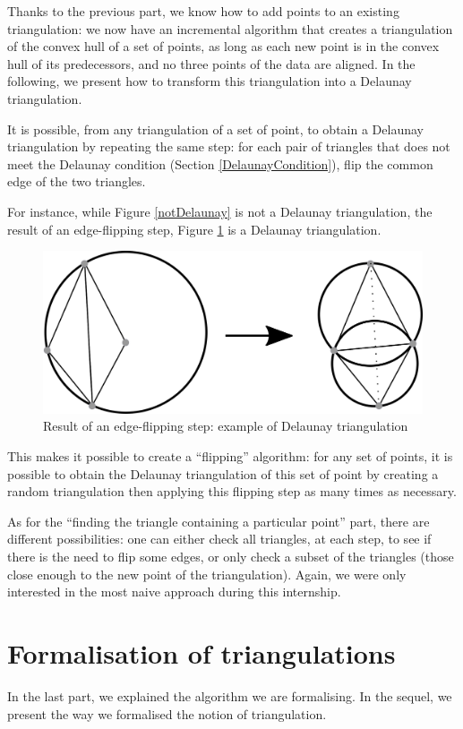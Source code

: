 \documentclass[a4paper,10pt]{article}
\begin{document}
Thanks to the previous part, we know how to add points to an existing triangulation: we now have an incremental algorithm that creates a triangulation of the convex hull of a set of points, as long as each new point is in the convex hull of its predecessors, and no three points of the data are aligned. In the following, we present how to transform this triangulation into a Delaunay triangulation.

It is possible, from any triangulation of a set of point, to obtain a Delaunay triangulation by repeating the same step: for each pair of triangles that does not meet the Delaunay condition (Section \ref{DelaunayCondition}), flip the common edge of the two triangles.

For instance, while Figure \ref{notDelaunay} is not a Delaunay triangulation, the result of an edge-flipping step, Figure \ref{DelaunayTriangulation} is a Delaunay triangulation.
\begin{figure}
\centering
\includegraphics[scale=1]{dessin1}
\caption{\label{DelaunayTriangulation} Result of an edge-flipping step: example of Delaunay triangulation}
\end{figure}
This makes it possible to create a ``flipping'' algorithm: for any set of points, it is possible to obtain the Delaunay triangulation of this set of point by creating a random triangulation then applying this flipping step as many times as necessary.

As for the ``finding the triangle containing a particular point'' part, there are different possibilities: one can either check all triangles, at each step, to see if there is the need to flip some edges, or only check a subset of the triangles (those close enough to the new point of the triangulation). Again, we were only interested in the most naive approach during this internship.
\section{Formalisation of triangulations}
\label{formalisation}
In the last part, we explained the algorithm we are formalising. In the sequel, we present the way we formalised the notion of triangulation.
\end{document}

